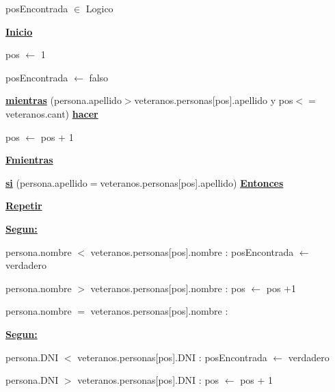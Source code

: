 \documentclass{article}
\begin{document}
            \hspace{12mm}posEncontrada $\in$ Logico
            
        \hspace{8mm}\underline{\textbf{Inicio}}

            \hspace{12mm}pos $\leftarrow$ 1

            \hspace{12mm}posEncontrada $\leftarrow$ falso

            \hspace{12mm}\underline{\textbf{mientras}} (persona.apellido$>$veteranos.personas[pos].apellido
            y pos$<=$veteranos.cant) \underline{\textbf{hacer}}

                \hspace{16mm}pos $\leftarrow$ pos + 1

            \hspace{12mm}\underline{\textbf{Fmientras}}

            \hspace{12mm}\underline{\textbf{si}} (persona.apellido$=$veteranos.personas[pos].apellido) \underline{\textbf{Entonces}}

                \hspace{16mm}\underline{\textbf{Repetir}}

                    \hspace{20mm}\underline{\textbf{Segun:}} 

                        \hspace{24mm} persona.nombre $<$ veteranos.personas[pos].nombre : posEncontrada $\leftarrow$ verdadero

                        \hspace{24mm} persona.nombre $>$ veteranos.personas[pos].nombre : pos $\leftarrow$ pos +1

                        \hspace{24mm} persona.nombre $=$ veteranos.personas[pos].nombre :

                            \hspace{28mm} \underline{\textbf{Segun:}}

                                \hspace{32mm} persona.DNI $<$ veteranos.personas[pos].DNI : posEncontrada $\leftarrow$ verdadero

                                \hspace{32mm} persona.DNI $>$ veteranos.personas[pos].DNI : pos $\leftarrow$ pos + 1
\end{document}
